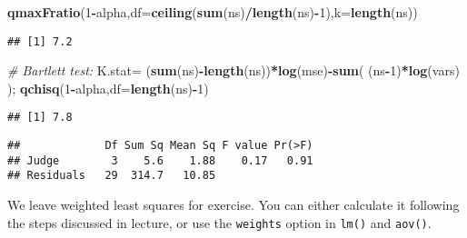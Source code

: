\documentclass[12pt,]{book}
\newenvironment{Shaded}{\begin{snugshade}}{\end{snugshade}}
\newcommand{\KeywordTok}[1]{\textcolor[rgb]{0.13,0.29,0.53}{\textbf{#1}}}
\newcommand{\DataTypeTok}[1]{\textcolor[rgb]{0.13,0.29,0.53}{#1}}
\newcommand{\DecValTok}[1]{\textcolor[rgb]{0.00,0.00,0.81}{#1}}
\newcommand{\StringTok}[1]{\textcolor[rgb]{0.31,0.60,0.02}{#1}}
\newcommand{\CommentTok}[1]{\textcolor[rgb]{0.56,0.35,0.01}{\textit{#1}}}
\newcommand{\OperatorTok}[1]{\textcolor[rgb]{0.81,0.36,0.00}{\textbf{#1}}}
\newcommand{\NormalTok}[1]{#1}
\begin{document}
\begin{Shaded}
\begin{Highlighting}[]
\KeywordTok{qmaxFratio}\NormalTok{(}\DecValTok{1}\OperatorTok{-}\NormalTok{alpha,}\DataTypeTok{df=}\KeywordTok{ceiling}\NormalTok{(}\KeywordTok{sum}\NormalTok{(ns)}\OperatorTok{/}\KeywordTok{length}\NormalTok{(ns)}\OperatorTok{-}\DecValTok{1}\NormalTok{),}\DataTypeTok{k=}\KeywordTok{length}\NormalTok{(ns))}
\end{Highlighting}
\end{Shaded}

\begin{verbatim}
## [1] 7.2
\end{verbatim}

\begin{Shaded}
\begin{Highlighting}[]
\CommentTok{# Bartlett test:}
\NormalTok{K.stat=}\StringTok{ }\NormalTok{(}\KeywordTok{sum}\NormalTok{(ns)}\OperatorTok{-}\KeywordTok{length}\NormalTok{(ns))}\OperatorTok{*}\KeywordTok{log}\NormalTok{(mse)}\OperatorTok{-}\KeywordTok{sum}\NormalTok{( (ns}\OperatorTok{-}\DecValTok{1}\NormalTok{)}\OperatorTok{*}\KeywordTok{log}\NormalTok{(vars) );}
\KeywordTok{qchisq}\NormalTok{(}\DecValTok{1}\OperatorTok{-}\NormalTok{alpha,}\DataTypeTok{df=}\KeywordTok{length}\NormalTok{(ns)}\OperatorTok{-}\DecValTok{1}\NormalTok{)}
\end{Highlighting}
\end{Shaded}

\begin{verbatim}
## [1] 7.8
\end{verbatim}

\begin{Shaded}
\end{Shaded}

\begin{verbatim}
##             Df Sum Sq Mean Sq F value Pr(>F)
## Judge        3    5.6    1.88    0.17   0.91
## Residuals   29  314.7   10.85
\end{verbatim}

We leave weighted least squares for exercise. You can either calculate
it following the steps discussed in lecture, or use the \texttt{weights}
option in \texttt{lm()} and \texttt{aov()}.
\end{document}
